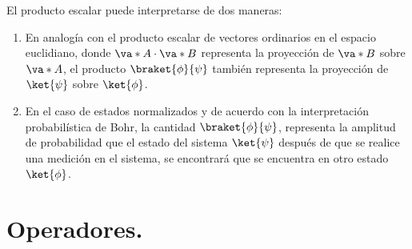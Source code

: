 El producto escalar puede interpretarse de dos maneras:
\begin{enumerate}[label=\arabic*)]
\item En analogía con el producto escalar de vectores ordinarios en el espacio euclidiano, donde $\va*{A} \cdot \va*{B}$ representa la proyección de $\va*{B}$ sobre $\va*{A}$, el producto $\braket{\phi}{\psi}$ también representa la proyección de $\ket{\psi}$ sobre $\ket{\phi}$.
\item En el caso de estados normalizados y de acuerdo con la interpretación probabilística de Bohr, la cantidad $\braket{\phi}{\psi}$, representa la amplitud de probabilidad que el estado del sistema $\ket{\psi}$ después de que se realice una medición en el sistema, se encontrará que se encuentra en otro estado $\ket{\phi}$.
\end{enumerate}

\section{Operadores.}
